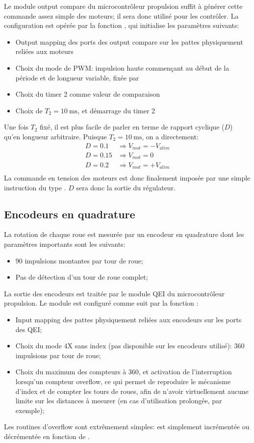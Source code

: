 Le module output compare du microcontrôleur propulsion suffit à générer cette commande assez simple des moteurs; il sera donc utilisé pour les contrôler. La configuration est opérée par la fonction , qui initialise les paramètres suivants:
\begin{itemize}
  \item Output mapping des ports des output compare sur les pattes physiquement reliées aux moteurs
  \item Choix du mode de PWM: impulsion haute commençant au début de la période et de longueur variable, fixée par 
  \item Choix du timer 2 comme valeur de comparaison
  \item Choix de $T_2 = \SI{10}{\milli\second}$, et démarrage du timer 2
\end{itemize}
Une fois $T_2$ fixé, il est plus facile de parler en terme de rapport cyclique ($D$) qu'en longueur arbitraire. Puisque $T_2 = \SI{10}{\milli\second}$, on a directement:
\begin{align*}
  D = 0.1 &\Rightarrow V_{mot} = -V_{alim}\\
  D = 0.15 &\Rightarrow V_{mot} = 0\\
  D = 0.2 &\Rightarrow V_{mot} = +V_{alim}\\
\end{align*}
La commande en tension des moteurs est donc finalement imposée par une simple instruction du type . $D$ sera donc la sortie du régulateur.

\subsection{Encodeurs en quadrature}
La rotation de chaque roue est mesurée par un encodeur en quadrature dont les paramètres importants sont les suivants:
\begin{itemize}
  \item 90 impulsions montantes par tour de roue;
  \item Pas de détection d'un tour de roue complet;
\end{itemize}
La sortie des encodeurs est traitée par le module QEI du microcontrôleur propulsion. Le module est configuré comme suit par la fonction :
\begin{itemize}
  \item Input mapping des pattes physiquement reliées aux encodeurs sur les ports des QEI;
  \item Choix du mode 4X sans index (pas disponible sur les encodeurs utilisé): 360 impulsions par tour de roue;
  \item Choix du maximum des compteurs à 360, et activation de l'interruption lorsqu'un compteur overflow, ce qui permet de reproduire le mécanisme d'index et de compter les tours de roues, afin de n'avoir virtuellement aucune limite sur les distances à mesurer (en cas d'utilisation prolongée, par exemple);
\end{itemize}
Les routines d'overflow sont extrêmement simples:  est simplement incrémentée ou décrémentée en fonction de .

